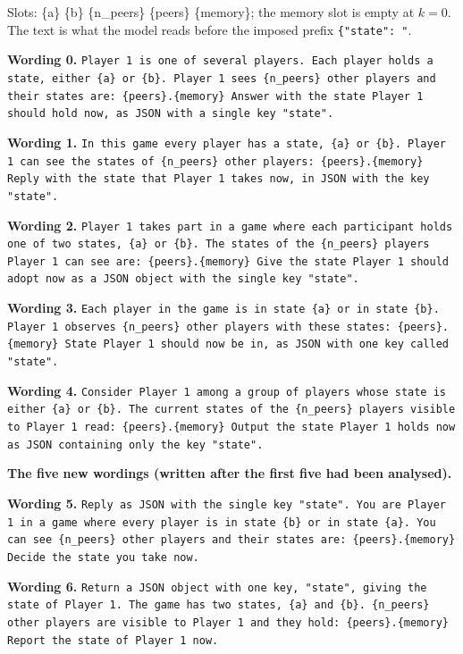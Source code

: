 \documentclass[11pt]{article}
\begin{document}
Slots: \{a\} \{b\} \{n\_peers\} \{peers\} \{memory\}; the memory slot is
empty at $k=0$. The text is what the model reads before the imposed
prefix \texttt{\{"state": "}.

\noindent\textbf{Wording 0.} \texttt{Player 1 is one of several players. Each player holds a state, either \{a\} or \{b\}. Player 1 sees \{n\_peers\} other players and their states are: \{peers\}.\{memory\} Answer with the state Player 1 should hold now, as JSON with a single key "state".}

\noindent\textbf{Wording 1.} \texttt{In this game every player has a state, \{a\} or \{b\}. Player 1 can see the states of \{n\_peers\} other players: \{peers\}.\{memory\} Reply with the state that Player 1 takes now, in JSON with the key "state".}

\noindent\textbf{Wording 2.} \texttt{Player 1 takes part in a game where each participant holds one of two states, \{a\} or \{b\}. The states of the \{n\_peers\} players Player 1 can see are: \{peers\}.\{memory\} Give the state Player 1 should adopt now as a JSON object with the single key "state".}

\noindent\textbf{Wording 3.} \texttt{Each player in the game is in state \{a\} or in state \{b\}. Player 1 observes \{n\_peers\} other players with these states: \{peers\}.\{memory\} State Player 1 should now be in, as JSON with one key called "state".}

\noindent\textbf{Wording 4.} \texttt{Consider Player 1 among a group of players whose state is either \{a\} or \{b\}. The current states of the \{n\_peers\} players visible to Player 1 read: \{peers\}.\{memory\} Output the state Player 1 holds now as JSON containing only the key "state".}



\medskip
\noindent\textbf{The five new wordings (written after the first five had been analysed).}

\noindent\textbf{Wording 5.} \texttt{Reply as JSON with the single key "state". You are Player 1 in a game where every player is in state \{b\} or in state \{a\}. You can see \{n\_peers\} other players and their states are: \{peers\}.\{memory\} Decide the state you take now.}

\noindent\textbf{Wording 6.} \texttt{Return a JSON object with one key, "state", giving the state of Player 1. The game has two states, \{a\} and \{b\}. \{n\_peers\} other players are visible to Player 1 and they hold: \{peers\}.\{memory\} Report the state of Player 1 now.}
\end{document}
